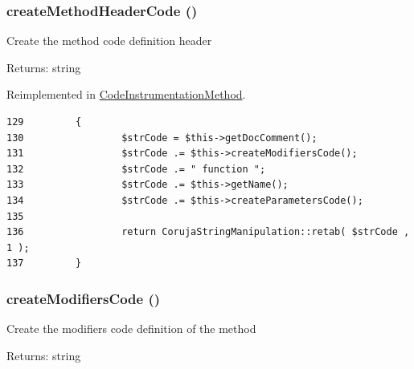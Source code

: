 \hypertarget{class_code_reflection_method_3d517292204047acfc6bb54cc09a38e3}{
\subsubsection[{createMethodHeaderCode}]{\setlength{\rightskip}{0pt plus 5cm}createMethodHeaderCode ()}}
\label{class_code_reflection_method_3d517292204047acfc6bb54cc09a38e3}


Create the method code definition header

\begin{Desc}
\item[Returns:]string \end{Desc}


Reimplemented in \hyperlink{class_code_instrumentation_method_3d517292204047acfc6bb54cc09a38e3}{CodeInstrumentationMethod}.

\begin{Code}\begin{verbatim}129         {
130                 $strCode = $this->getDocComment();
131                 $strCode .= $this->createModifiersCode();
132                 $strCode .= " function ";
133                 $strCode .= $this->getName();
134                 $strCode .= $this->createParametersCode();
135 
136                 return CorujaStringManipulation::retab( $strCode , 1 );
137         }
\end{verbatim}
\end{Code}


\hypertarget{class_code_reflection_method_17316de2d114d63b0c66ce8c81cb948e}{
\subsubsection[{createModifiersCode}]{\setlength{\rightskip}{0pt plus 5cm}createModifiersCode ()}}
\label{class_code_reflection_method_17316de2d114d63b0c66ce8c81cb948e}


Create the modifiers code definition of the method

\begin{Desc}
\item[Returns:]string \end{Desc}



